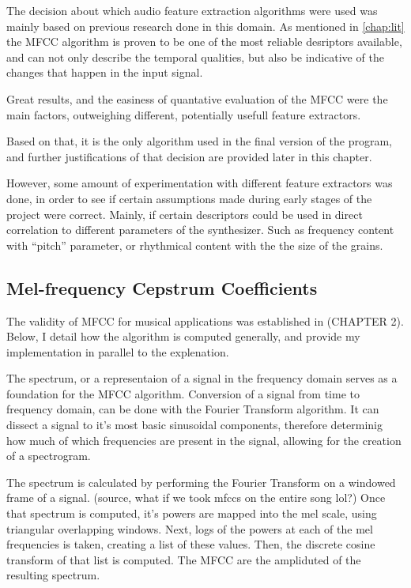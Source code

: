 The decision about which audio feature extraction algorithms were used
was mainly based on previous research done in this domain. As
mentioned in \autoref{chap:lit} the MFCC algorithm is proven to be one
of the most reliable desriptors available, and can not only describe
the temporal qualities, but also be indicative of the changes that
happen in the input signal\cite{terasawa_center_2005}.

Great results, and the easiness of quantative evaluation of the
MFCC\cite{yee-king_automatic_2018} were the main factors, outweighing
different, potentially usefull feature extractors.

Based on that, it is the only algorithm used in the final version of
the program, and further justifications of that decision are provided
later in this chapter.

However, some amount of experimentation with different feature
extractors was done, in order to see if certain assumptions made during early stages of the project were
correct. Mainly, if certain descriptors could be used in direct
correlation to different parameters of the synthesizer. Such as
frequency content with ``pitch'' parameter, or rhythmical content with
the the size of the grains.

\subsection{Mel-frequency Cepstrum Coefficients}

The validity of MFCC for musical applications was established in
(CHAPTER 2). Below, I detail how the algorithm is computed generally,
and provide my implementation in parallel to the explenation.

The spectrum, or a representaion of a signal in the frequency domain
serves as a foundation for the MFCC algorithm. Conversion of a
signal from time to frequency domain, can be done with the Fourier
Transform algorithm. It can dissect a signal to it's most basic
sinusoidal components, therefore determinig how much of which
frequencies are present in the signal, allowing for the creation of a
spectrogram.

The spectrum is calculated by performing the Fourier Transform on a
windowed frame of a signal. (source, what if we took mfccs on the
entire song lol?) Once that spectrum is computed, it's powers are
mapped into the mel scale, using triangular overlapping windows. Next,
logs of the powers at each of the mel frequencies is taken, creating a
list of these values. Then, the discrete cosine transform of that list
is computed. The MFCC are the ampliduted of the resulting spectrum.


